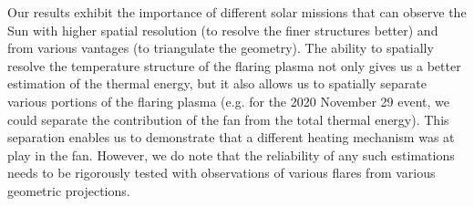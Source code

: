 Our results exhibit the importance of different solar missions that can observe the Sun with higher spatial resolution (to resolve the finer structures better) and from various vantages (to triangulate the geometry). The ability to spatially resolve the temperature structure of the flaring plasma not only gives us a better estimation of the thermal energy, but it also allows us to spatially separate various portions of the flaring plasma (e.g. for the 2020 November 29 event, we could separate the contribution of the fan from the total thermal energy). This separation enables us to demonstrate that a different heating mechanism was at play in the fan. However, we do note that the reliability of any such estimations needs to be rigorously tested with observations of various flares from various geometric projections.